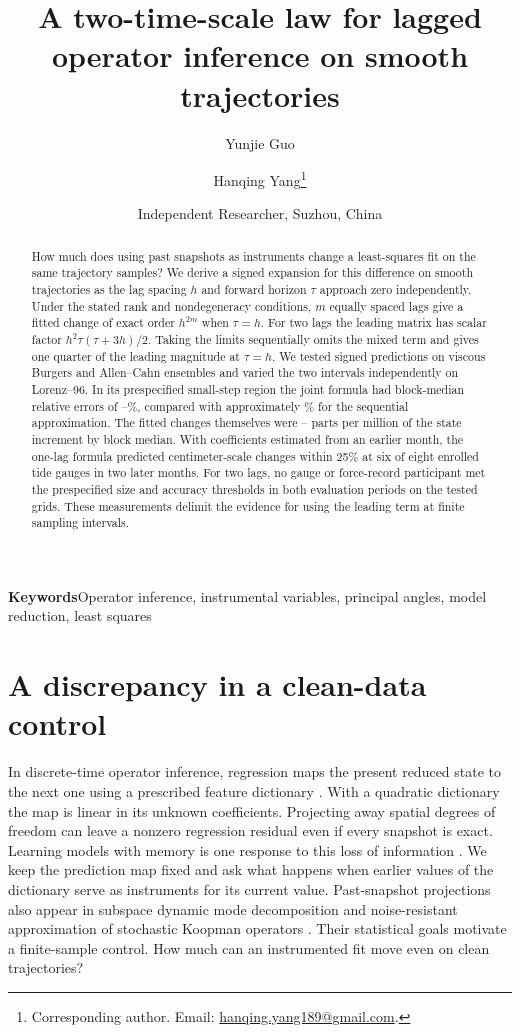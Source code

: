 \documentclass[11pt,a4paper]{article}
\title{A two-time-scale law for lagged operator inference on smooth trajectories}
\author{Yunjie Guo \and Hanqing Yang\thanks{Corresponding author. Email:
\href{mailto:hanqing.yang189@gmail.com}{hanqing.yang189@gmail.com}.}}
\date{Independent Researcher, Suzhou, China}
\begin{document}
\maketitle
\begin{abstract}
How much does using past snapshots as instruments change a least-squares fit on the same trajectory samples? We derive a signed expansion for this difference on smooth trajectories as the lag spacing $h$ and forward horizon $\tau$ approach zero independently. Under the stated rank and nondegeneracy conditions, $m$ equally spaced lags give a fitted change of exact order $h^{2m}$ when $\tau=h$. For two lags the leading matrix has scalar factor $h^2\tau(\tau+3h)/2$. Taking the limits sequentially omits the mixed term and gives one quarter of the leading magnitude at $\tau=h$. We tested signed predictions on viscous Burgers and Allen--Cahn ensembles and varied the two intervals independently on Lorenz--96. In its prespecified small-step region the joint formula had block-median relative errors of \JointPctLo--\JointPctHi\%, compared with approximately \SepMedianPct\% for the sequential approximation. The fitted changes themselves were \ReviewPPMLo--\ReviewPPMHi{} parts per million of the state increment by block median. With coefficients estimated from an earlier month, the one-lag formula predicted centimeter-scale changes within 25\% at six of eight enrolled tide gauges in two later months. For two lags, no gauge or force-record participant met the prespecified size and accuracy thresholds in both evaluation periods on the tested grids. These measurements delimit the evidence for using the leading term at finite sampling intervals.
\end{abstract}
\noindent\textbf{Keywords}\quad Operator inference, instrumental variables, principal angles, model reduction, least squares

\section{A discrepancy in a clean-data control}
In discrete-time operator inference, regression maps the present reduced state to the next one using a prescribed feature dictionary \cite{opinf}. With a quadratic dictionary the map is linear in its unknown coefficients. Projecting away spatial degrees of freedom can leave a nonzero regression residual even if every snapshot is exact. Learning models with memory is one response to this loss of information \cite{memory}. We keep the prediction map fixed and ask what happens when earlier values of the dictionary serve as instruments for its current value. Past-snapshot projections also appear in subspace dynamic mode decomposition and noise-resistant approximation of stochastic Koopman operators \cite{takeishi,wanner}. Their statistical goals motivate a finite-sample control. How much can an instrumented fit move even on clean trajectories?
\end{document}
